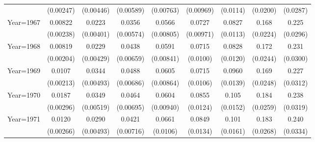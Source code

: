 \begin{table}[htbp]
\begin{tabular}{l*{8}{c}}
                    &   (0.00247)         &   (0.00446)         &   (0.00589)         &   (0.00763)         &   (0.00969)         &    (0.0114)         &    (0.0200)         &    (0.0287)         \\
[1em]
Year=1967           &     0.00822\sym{***}&      0.0223\sym{***}&      0.0356\sym{***}&      0.0566\sym{***}&      0.0727\sym{***}&      0.0827\sym{***}&       0.168\sym{***}&       0.225\sym{***}\\
                    &   (0.00238)         &   (0.00401)         &   (0.00574)         &   (0.00805)         &   (0.00971)         &    (0.0113)         &    (0.0224)         &    (0.0296)         \\
[1em]
Year=1968           &     0.00819\sym{***}&      0.0229\sym{***}&      0.0438\sym{***}&      0.0591\sym{***}&      0.0715\sym{***}&      0.0828\sym{***}&       0.172\sym{***}&       0.231\sym{***}\\
                    &   (0.00204)         &   (0.00429)         &   (0.00659)         &   (0.00841)         &    (0.0100)         &    (0.0120)         &    (0.0244)         &    (0.0300)         \\
[1em]
Year=1969           &      0.0107\sym{***}&      0.0344\sym{***}&      0.0488\sym{***}&      0.0605\sym{***}&      0.0715\sym{***}&      0.0960\sym{***}&       0.169\sym{***}&       0.227\sym{***}\\
                    &   (0.00213)         &   (0.00493)         &   (0.00686)         &   (0.00864)         &    (0.0106)         &    (0.0139)         &    (0.0248)         &    (0.0312)         \\
[1em]
Year=1970           &      0.0187\sym{***}&      0.0349\sym{***}&      0.0464\sym{***}&      0.0604\sym{***}&      0.0855\sym{***}&       0.105\sym{***}&       0.184\sym{***}&       0.238\sym{***}\\
                    &   (0.00296)         &   (0.00519)         &   (0.00695)         &   (0.00940)         &    (0.0124)         &    (0.0152)         &    (0.0259)         &    (0.0319)         \\
[1em]
Year=1971           &      0.0120\sym{***}&      0.0290\sym{***}&      0.0421\sym{***}&      0.0661\sym{***}&      0.0849\sym{***}&       0.101\sym{***}&       0.183\sym{***}&       0.240\sym{***}\\
                    &   (0.00266)         &   (0.00493)         &   (0.00716)         &    (0.0106)         &    (0.0134)         &    (0.0161)         &    (0.0268)         &    (0.0334)         \\

\end{tabular}
\end{table}
